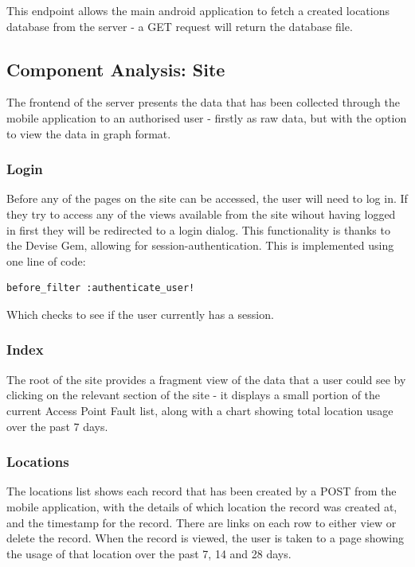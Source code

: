 \documentclass[11pt]{informatics-report}
\begin{document}
This endpoint allows the main android application to fetch a created locations database from the server - a GET request will return the database file.

\subsection{Component Analysis: Site}

The frontend of the server presents the data that has been collected through the mobile application to an authorised user - firstly as raw data, but with the option to view the data in graph format. 

\subsubsection{Login}

Before any of the pages on the site can be accessed, the user will need to log in. If they try to access any of the views available from the site wihout having logged in first they will be redirected to a login dialog. This functionality is thanks to the Devise Gem, allowing for session-authentication. This is implemented using one line of code:

\begin{verbatim}
before_filter :authenticate_user!
\end{verbatim}

Which checks to see if the user currently has a session.

\subsubsection{Index}

The root of the site provides a fragment view of the data that a user could see by clicking on the relevant section of the site - it displays a small portion of the current Access Point Fault list, along with a chart showing total location usage over the past 7 days.

\subsubsection{Locations}

The locations list shows each record that has been created by a POST from the mobile application, with the details of which location the record was created at, and the timestamp for the record. There are links on each row to either view or delete the record. When the record is viewed, the user is taken to a page showing the usage of that location over the past 7, 14 and 28 days. 
\end{document}
